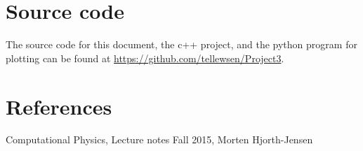 \documentclass{aa}   %
\begin{document}
\section{Source code}\label{sec:source}
The source code for this document, the c++ project, and the python program for plotting can be found at \url{https://github.com/tellewsen/Project3}.


\section{References}
Computational Physics, Lecture notes Fall 2015, Morten Hjorth-Jensen

\end{document}
